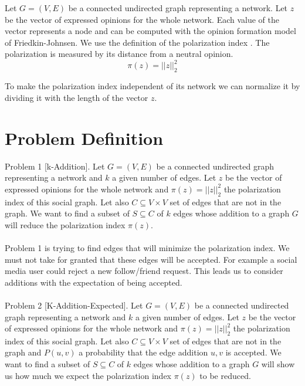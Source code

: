 \noindent Let $G = (V,E)$ be a connected undirected graph representing a network. Let $z$ be the vector of expressed opinions  for the whole network. Each value  of the vector represents a node and can be computed with the opinion formation model of Friedkin-Johnsen. We use the definition of the polarization index \cite{tsapMatakosTerzi}. The polarization is measured by its distance from a neutral opinion.
\vspace{20pt}
\begin{equation}
	\pi(z) = ||z||_{2}^2
\end{equation}
\vspace{20pt}

\noindent To make the polarization index independent of its network we can normalize it by dividing it with the length of the vector $z$. 
\clearpage

\section{Problem Definition}
\label{sec:problemDef}

\noindent Problem 1 [k-Addition]. \noindent Let $G = (V,E)$ be a connected undirected graph representing a network and $k$ a given number of edges. Let $z$ be the vector of expressed opinions  for the whole network and $\pi(z) = ||z||_{2}^2$ the polarization index of this social graph. Let also $C \subseteq	V \times V$ set of edges that are not in the graph. We want to find a subset of $S \subseteq C$ of $k$ edges whose addition to a graph $G$ will reduce the polarization index $\pi(z)$.
\\
\\
\noindent Problem 1 is trying to find edges that will minimize the polarization index. We must not take for granted that these edges will be accepted. 
For example a social media user could reject a new follow/friend request. This leads us to consider additions with the expectation of being accepted. 
\\
\\
\noindent Problem 2 [K-Addition-Expected]. Let $G = (V,E)$ be a connected undirected graph representing a network and $k$ a given number of edges. Let $z$ be the vector of expressed opinions  for the whole network and $\pi(z) = ||z||_{2}^2$ the polarization index of this social graph. Let also $C \subseteq V \times V$ set of edges that are not in the graph and $P(u,v)$ a probability that the edge addition $u,v$ is accepted. We want to find a subset of $S \subseteq C$ of $k$ edges whose addition to a graph $G$ will show us how much we expect the polarization index $\pi(z)$ to be reduced.


